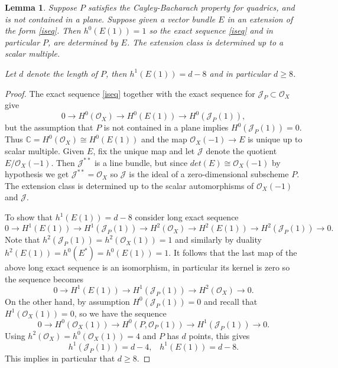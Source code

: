 \documentclass{amsart}
\theoremstyle{plain}
\newtheorem{lemma}[theorem]{Lemma}
\numberwithin{equation}{section}
\begin{document}
\begin{lemma}
\label{notplanesit}
Suppose $P$ satisfies the Cayley-Bacharach property 
for quadrics, and is not contained in a plane.
Suppose given a vector bundle $E$ in an extension
of the form \eqref{iseq}. Then $h^0(E(1))=1$ so the exact sequence \eqref{iseq}
and in particular $P$, are determined by $E$. The extension class is determined up to
a scalar multiple. 

Let $d$ denote the length of $P$, then $h^1(E(1))=d-8$ and in particular $d\geq 8$.
\end{lemma}
\begin{proof}
The exact sequence \eqref{iseq} together with the exact sequence
for ${{\mathcal J}} _P\subset {{\mathcal O}} _X$ give 
$$
0\rightarrow H^0({{\mathcal O}} _X)\rightarrow H^0(E(1))\rightarrow H^0({{\mathcal J}} _P (1)),
$$
but the assumption that $P$ is not contained in a plane implies
$H^0({{\mathcal J}} _P (1))=0$. Thus ${{\mathbb C}} = H^0({{\mathcal O}} _X)\cong H^0(E(1))$ 
and the map ${{\mathcal O}} _X(-1)\rightarrow E$ is unique up
to scalar multiple. Given $E$, fix the unique map and 
let ${{\mathcal J}} $ denote the quotient $E/{{\mathcal O}} _X(-1)$. Then
${{\mathcal J}} ^{\ast \ast}$ is a line bundle, but since $det(E)\cong {{\mathcal O}} _X(-1)$ by hypothesis
we get ${{\mathcal J}} ^{\ast \ast} ={{\mathcal O}} _X$ so ${{\mathcal J}} $ is the ideal of a zero-dimensional subscheme 
$P$. The extension class is determined up to the scalar automorphisms of ${{\mathcal O}} _X(-1)$ and 
${{\mathcal J}}$. 

To show that $h^1(E(1))=d-8$ consider long exact sequence
$$
0 \rightarrow 
H^1(E(1))\rightarrow H^1({{\mathcal J}} _P(1))  
\rightarrow H^2({{\mathcal O}} _X) \rightarrow H^2(E(1))\rightarrow 
H^2({{\mathcal J}} _P(1)) \rightarrow 0.
$$
Note that 
$h^2({{\mathcal J}} _P(1))=  h^2({{\mathcal O}} _X(1)) =1$
and similarly by duality 
$h^2(E(1))= h^0(E^{\ast})= h^0(E(1))=1$. 
It follows that the last map of the above long exact sequence is an 
isomorphism, in particular its kernel is zero so the sequence becomes
$$
0\rightarrow H^1(E(1))\rightarrow H^1({{\mathcal J}} _P(1)) \rightarrow H^2({{\mathcal O}} _X) \rightarrow 0.
$$
On the other hand, by assumption $H^0({{\mathcal J}} _P(1))=0$ and recall that
$H^1({{\mathcal O}} _X(1))=0$, so we have the sequence
$$
0\rightarrow H^0({{\mathcal O}} _X(1))\rightarrow H^0(P, {{\mathcal O}} _P(1))\rightarrow 
H^1({{\mathcal J}} _P(1)) \rightarrow 0.
$$
Using $h^2({{\mathcal O}} _X)= h^0({{\mathcal O}} _X(1)) = 4$ and $P$ has $d$ points, this gives
$$
h^1({{\mathcal J}} _P(1)) = d-4, \;\;\; h^1(E(1)) = d-8.
$$
This implies in particular that $d\geq 8$.
\end{proof}
\end{document}
